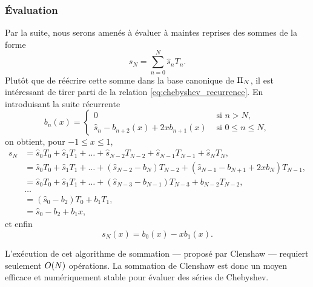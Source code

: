 \subsubsection{Évaluation}
Par la suite, nous serons amenés à évaluer à maintes reprises des sommes de la forme
\begin{equation}
	s_N = \sum_{n=0}^N \hat{s}_n T_n.
	\label{eq:chebyshev_sum}
\end{equation}
Plutôt que de réécrire cette somme dans la base canonique de $\Pi_{N}$, il est intéressant de tirer parti de la relation \eqref{eq:chebyshev_recurrence}. 
En introduisant la suite récurrente
\begin{equation}
	b_n(x) = 
	\begin{cases}
	 0 & \text{\ si\ } n > N,   \\ 
	 \hat{s}_n - b_{n+2}(x) + 2x b_{n+1}(x) & \text{\ si\ } 0 \leq n \leq N,
	\end{cases}
\end{equation}
on obtient, pour $-1 \leq x \leq 1$,%
\def\px{}%
\begin{align*}
	s_N\px 
	&= \hat{s}_0 T_0\px + \hat{s}_1 T_1\px + \ldots + \hat{s}_{N-2} T_{N-2}\px + \hat{s}_{N-1} T_{N-1}\px + \hat{s}_N T_N\px, \\
	&= \hat{s}_0 T_0 \px
	+ \hat{s}_1 T_1 \px
	+ \ldots 
	+ \left(\hat{s}_{N-2} - b_{N}\px\right) T_{N-2} \px
	+ \left(\hat{s}_{N-1} - b_{N+1}\px + 2x b_{N}\px \right) T_{N-1}\px, \\
	&= \hat{s}_0 T_0 \px
	+ \hat{s}_1 T_1 \px
	+ \ldots 
	+ \left(\hat{s}_{N-3} - b_{N-1}\px\right) T_{N-3} \px
	+ b_{N-2}\px T_{N-2}\px, \\
	& \ldots\\
	&= \left( \hat{s}_0 - b_2\px \right) T_0\px + b_1\px T_1\px, \\
	&= \hat{s}_0 - b_2\px + b_1\px x,
\end{align*}
et enfin
\begin{equation}
	s_N(x) = b_0(x) - x b_1(x).
\end{equation}

L'exécution de cet algorithme de sommation --- proposé par Clenshaw \cite{clenshaw1955} --- requiert seulement $O\!\left( {N} \right)$ opérations. %
La sommation de Clenshaw est donc un moyen efficace et numériquement stable pour évaluer des séries de Chebyshev.


